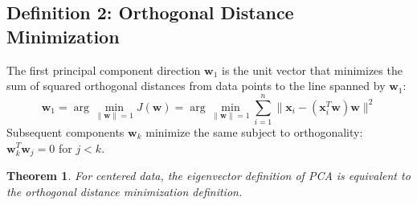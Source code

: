 \documentclass{article}
\newtheorem{theorem}{Theorem}
\begin{document}
\subsection*{Definition 2: Orthogonal Distance Minimization}
The first principal component direction $\mathbf{w}_1$ is the unit vector that minimizes the sum of squared orthogonal distances from data points to the line spanned by $\mathbf{w}_1$:
\begin{equation*}
    \mathbf{w}_1 = \arg\min_{\|\mathbf{w}\|=1} J(\mathbf{w}) = \arg\min_{\|\mathbf{w}\|=1} \sum_{i=1}^n \|\mathbf{x}_i - (\mathbf{x}_i^T\mathbf{w})\mathbf{w}\|^2
\end{equation*}
Subsequent components $\mathbf{w}_k$ minimize the same subject to orthogonality: $\mathbf{w}_k^T\mathbf{w}_j = 0$ for $j < k$.

\begin{theorem}
For centered data, the eigenvector definition of PCA is equivalent to the orthogonal distance minimization definition.
\end{theorem}
\end{document}
